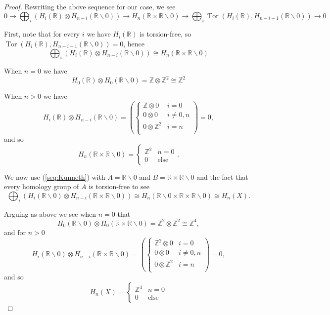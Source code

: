 \documentclass{article}
\DeclareMathOperator{\Tor}{Tor}
\begin{document}
\begin{enumerate}
\begin{proof}
		Rewriting the above sequence for our case, we see 
		\[ 0 \rightarrow \bigoplus_i \left ( H_i(\mathbb{R}) \otimes H_{n-i}(\mathbb{R}\backslash 0) \right ) \rightarrow H_n(\mathbb{R}\times \mathbb{R}\backslash 0) \rightarrow
		\bigoplus_i \Tor \left ( H_i(\mathbb{R}), H_{n-i-1}(\mathbb{R}\backslash 0) \right ) \rightarrow 0\]
		
		First, note that for every $i$ we have $H_i(\mathbb{R})$ is torsion-free, so $\Tor \left ( H_i(\mathbb{R}), H_{n-i-1}(\mathbb{R}\backslash 0) \right ) = 0$, hence
		\[ \bigoplus_i \left ( H_i(\mathbb{R}) \otimes H_{n-i}(\mathbb{R}\backslash 0) \right ) \cong H_n(\mathbb{R}\times \mathbb{R}\backslash 0) \]
		
		When $n =0$ we have 
		\[H_0 (\mathbb{R}) \otimes H_0 (\mathbb{R} \backslash 0) = \mathbb{Z} \otimes \mathbb{Z}^2 \cong \mathbb{Z}^2\]
		
		When $n>0$ we have 
		\[ H_i(\mathbb{R}) \otimes H_{n-i}(\mathbb{R}\backslash 0) = \left (\begin{cases} 
			\mathbb{Z} \otimes 0 & i=0\\  
			0 \otimes 0 & i \neq 0,n\\
			0 \otimes \mathbb{Z}^2 & i = n\\
			\end{cases} \right) = 0 ,\]
		and so
		\[H_{n}( \mathbb{R} \times \mathbb{R}\backslash 0) = \begin{cases} \mathbb{Z}^2 & n=0 \\ 0 &\text{else} \end{cases}.\]
		
		We now use (\ref{seq:Kunneth}) with $A = \mathbb{R} \backslash 0$ and $B = \mathbb{R} \times \mathbb{R} \backslash 0$ and the fact that every homology group of $A$ is torsion-free to see
		\[ \bigoplus_i \left ( H_i(\mathbb{R} \backslash 0) \otimes H_{n-i}(\mathbb{R} \times \mathbb{R}\backslash 0) \right ) \cong H_n(\mathbb{R} \backslash 0 \times\mathbb{R}\times \mathbb{R}\backslash 0) \cong H_n(X).\]
		
		Arguing as above we see when $n=0$ that
		\[ H_0(\mathbb{R} \backslash 0) \otimes H_0(\mathbb{R} \times \mathbb{R}\backslash 0) = \mathbb{Z}^2 \otimes \mathbb{Z}^2 \cong \mathbb{Z}^4,\]
		and 
		for $n >0$ 
		\[ H_i(\mathbb{R} \backslash 0 ) \otimes H_{n-i}(\mathbb{R} \times \mathbb{R}\backslash 0) = \left (\begin{cases} 
			\mathbb{Z}^2 \otimes 0 & i=0\\  
			0 \otimes 0 & i \neq 0,n\\
			0 \otimes \mathbb{Z}^2 & i = n\\
			\end{cases} \right) = 0 ,\]
		and so 
		\[ H_n(X) = \begin{cases} \mathbb{Z}^4 & n=0 \\ 0 & \text{else} \end{cases}\]
	\end{proof}
	

\end{enumerate}
\end{document}
